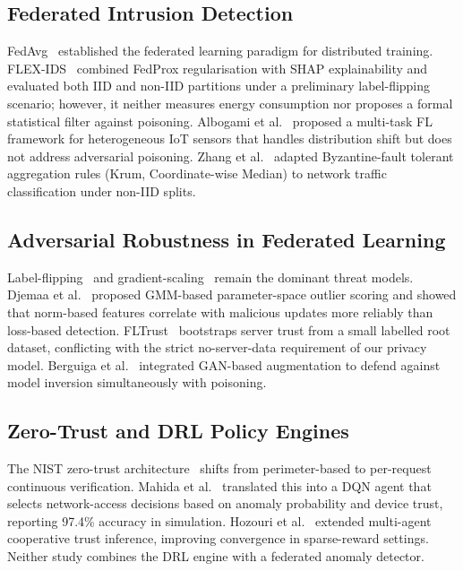\documentclass[11pt,a4paper,twocolumn]{article}
\theoremstyle{definition}
\begin{document}
\subsection{Federated Intrusion Detection}

FedAvg~\cite{mcmahan2017} established the federated learning paradigm for
distributed training.  FLEX-IDS~\cite{flexids} combined FedProx
regularisation with SHAP explainability and evaluated both IID and non-IID
partitions under a preliminary label-flipping scenario; however, it neither
measures energy consumption nor proposes a formal statistical filter against
poisoning.  Albogami et al.~\cite{albogami2025} proposed a multi-task FL
framework for heterogeneous IoT sensors that handles distribution shift but
does not address adversarial poisoning.  Zhang et al.~\cite{zhang2025}
adapted Byzantine-fault tolerant aggregation rules (Krum, Coordinate-wise
Median) to network traffic classification under non-IID splits.

\subsection{Adversarial Robustness in Federated Learning}

Label-flipping~\cite{tolpegin2020} and gradient-scaling~\cite{bagdasaryan2020}
remain the dominant threat models.  Djemaa et al.~\cite{djemaa2026} proposed
GMM-based parameter-space outlier scoring and showed that norm-based features
correlate with malicious updates more reliably than loss-based detection.
FLTrust~\cite{cao2022} bootstraps server trust from a small labelled root
dataset, conflicting with the strict no-server-data requirement of our
privacy model.  Berguiga et al.~\cite{berguiga2025} integrated GAN-based
augmentation to defend against model inversion simultaneously with poisoning.

\subsection{Zero-Trust and DRL Policy Engines}

The NIST zero-trust architecture~\cite{rose2020} shifts from perimeter-based
to per-request continuous verification.  Mahida et al.~\cite{mahida2026}
translated this into a DQN agent that selects network-access decisions based
on anomaly probability and device trust, reporting 97.4\% accuracy in
simulation.  Hozouri et al.~\cite{hozouri2025} extended multi-agent
cooperative trust inference, improving convergence in sparse-reward settings.
Neither study combines the DRL engine with a federated anomaly detector.
\end{document}
